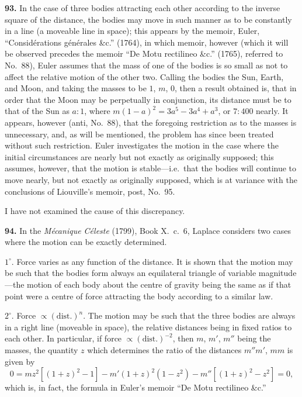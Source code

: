 \documentclass[11pt,a4paper]{article}
\theoremstyle{definition}
\begin{document}
\textbf{93.} In the case of three bodies attracting each other according to the inverse square of the distance, the bodies may move in such manner as to be constantly in a line (a moveable line in space); this appears by the memoir, Euler, ``Consid\'erations g\'en\'erales \&c.'' (1764), in which memoir, however (which it will be observed precedes the memoir ``De Motu rectilineo \&c.'' (1765), referred to No.~88), Euler assumes that the mass of one of the bodies is so small as not to affect the relative motion of the other two. Calling the bodies the Sun, Earth, and Moon, and taking the masses to be $1$, $m$, $0$, then a result obtained is, that in order that the Moon may be perpetually in conjunction, its distance must be to that of the Sun as $a : 1$, where $m(1-a)^2 = 3a^5 - 3a^4 + a^3$, or $7 : 400$ nearly. It appears, however (anti, No.~88), that the foregoing restriction as to the masses is unnecessary, and, as will be mentioned, the problem has since been treated without such restriction. Euler investigates the motion in the case where the initial circumstances are nearly but not exactly as originally supposed; this assumes, however, that the motion is stable---i.e.\ that the bodies will continue to move nearly, but not exactly as originally supposed, which is at variance with the conclusions of Liouville's memoir, post, No.~95.

I have not examined the cause of this discrepancy.

\textbf{94.} In the \textit{M\'ecanique C\'eleste} (1799), Book X.~c.~6, Laplace considers two cases where the motion can be exactly determined.

$1^\circ$. Force varies as any function of the distance. It is shown that the motion may be such that the bodies form always an equilateral triangle of variable magnitude---the motion of each body about the centre of gravity being the same as if that point were a centre of force attracting the body according to a similar law.

$2^\circ$. Force $\propto (\text{dist.})^n$. The motion may be such that the three bodies are always in a right line (moveable in space), the relative distances being in fixed ratios to each other. In particular, if force $\propto (\text{dist.})^{-2}$, then $m$, $m'$, $m''$ being the masses, the quantity $z$ which determines the ratio of the distances $m''m'$, $mm$ is given by
\[
0 = mz^2[(1+z)^2 - 1] - m'(1+z)^2(1-z^2) - m''[(1+z)^2 - z^2] = 0,
\]
which is, in fact, the formula in Euler's memoir ``De Motu rectilineo \&c.''
\end{document}
